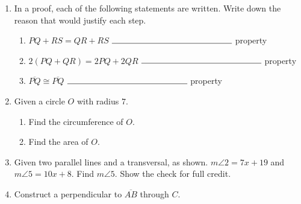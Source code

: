 \documentclass[12pt, oneside]{article}
\begin{document}
\begin{enumerate}
  \item In a proof, each of the following statements are written. Write down the reason that would justify each step. \bigskip
    \begin{enumerate}
      \item $PQ+RS= QR+RS$  \hspace{1.7cm} $\rule{5cm}{0.15mm}$ property  \bigskip
      \item $2(PQ + QR)=2PQ+2QR$  \hspace{0.6cm} $\rule{5cm}{0.15mm}$ property \bigskip
      \item $\overline{PQ} \cong \overline{PQ}$ \hspace{4cm} $\rule{5cm}{0.15mm}$ property
    \end{enumerate}

  \item Given a circle $O$ with radius $7$.
  \begin{enumerate}
    \item Find the circumference of $O$. \vspace{2cm}
    \item Find the area of $O$.
  \end{enumerate}

\newpage
\item Given two parallel lines and a transversal, as shown. $m\angle 2=7x+19$ and $m\angle 5=10x+8$. Find $m\angle 5$. Show the check for full credit.
  \begin{flushleft}
  \end{flushleft}
  \vspace{3cm}


  \item Construct a perpendicular to $\overline{AB}$ through $C$.\\
    \vspace{2cm}
    \begin{center}
    \end{center}


\end{enumerate}
\end{document}
